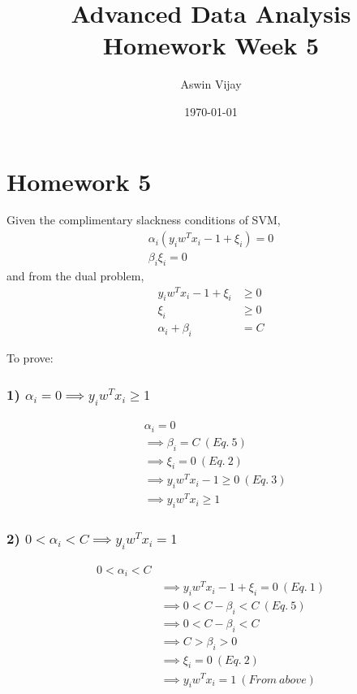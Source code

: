 \documentclass{article}
\title{Advanced Data Analysis\\Homework Week 5}
\author{Aswin Vijay}
\date\today
\begin{document}
\maketitle %

\section*{Homework 5}

Given the complimentary slackness conditions of SVM,
\begin{align}
    \alpha_i(y_i w^T x_i - 1 + \xi_i) = 0\\
    \beta_i \xi_i = 0
\end{align}
and from the dual problem,
\begin{align}
    y_i w^T x_i - 1 + \xi_i &\geq 0\\
    \xi_i &\geq 0\\
    \alpha_i + \beta_i &= C
\end{align}

To prove:
\subsubsection*{1) $\alpha_i=0\implies y_i w^T x_i \geq 1$}
\begin{align*}
    &\alpha_i = 0\\
    &\implies \beta_i = C\ (Eq.\ 5)\\
    &\implies \xi_i = 0\ (Eq.\ 2)\\
    &\implies y_i w^T x_i - 1 \geq 0\ (Eq.\ 3)\\
    &\implies y_i w^T x_i \geq 1
\end{align*}
\subsubsection*{2) $0 < \alpha_i< C\implies y_i w^T x_i = 1$}
\begin{align*}
    0 < \alpha_i < C\\
    &\implies y_i w^T x_i - 1 + \xi_i = 0\ (Eq.\ 1)\\ 
    &\implies 0 < C - \beta_i < C\ (Eq.\ 5)\\
    &\implies 0 < C - \beta_i < C\\
    &\implies C > \beta_i > 0\\
    &\implies \xi_i = 0\ (Eq.\ 2)\\
    &\implies  y_i w^T x_i = 1\ (From\ above)
\end{align*}
\end{document}
